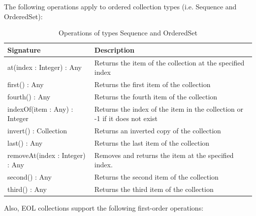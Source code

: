 The following operations apply to ordered collection types (i.e. Sequence and OrderedSet):

\begin{longtabu} {|p{6.5cm}|X|}
\caption{Operations of types Sequence and OrderedSet}
\label{tab:SortedOperations}\\
\hline
    \textbf{Signature} & \textbf{Description} \\\hline

    at(index : Integer) : Any & Returns the item of the collection at the specified index \\\hline
    
    first() : Any & Returns the first item of the collection  \\\hline
    
    fourth() : Any & Returns the fourth item of the collection  \\\hline
    
    indexOf(item : Any) : Integer & Returns the index of the item in the collection or -1 if it does not exist \\\hline
    
    invert() : Collection & Returns an inverted copy of the collection\\\hline
    
    last() : Any & Returns the last item of the collection  \\\hline
    
    removeAt(index : Integer) : Any & Removes and returns the item at the specified index. \\\hline
    
    second() : Any & Returns the second item of the collection  \\\hline
    
    third() : Any & Returns the third item of the collection  \\\hline
\end{longtabu}

Also, EOL collections support the following first-order operations:

